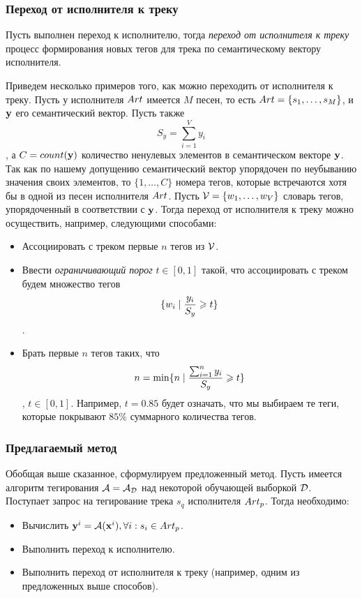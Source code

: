 \subsubsection{Переход от исполнителя к треку}

Пусть выполнен переход к исполнителю, тогда \emph{переход от исполнителя к треку} \ld процесс формирования новых тегов для трека по семантическому вектору исполнителя.

Приведем несколько примеров того, как можно переходить от исполнителя к треку. Пусть у исполнителя ${Art}$ имеется $M$ песен, то есть ${Art} = \{ s_1, \ldots, s_M \}$, 
и $\mathbf{y}$ \ld его семантический вектор. Пусть также $$S_y = \sum_{i=1}^{V} y_i$$, а $C = count(\mathbf{y})$ \ld количество ненулевых элементов в семантическом векторе $\mathbf{y}$.
Так как по нашему допущению семантический вектор упорядочен по неубыванию значения своих элементов, то $\{ 1, \ldots, C \}$ \ld номера тегов, которые встречаются хотя бы в одной 
из песен исполнителя ${Art}$. Пусть $\mathcal{V} = \{w_1, \ldots, w_V \}$ \ld словарь тегов, упорядоченный в соответствии с $\mathbf{y}$. 
Тогда переход от исполнителя к треку можно осуществить, например, следующими способами:
\begin{itemize}
 \item Ассоциировать с треком первые $n$ тегов из $\mathcal{V}$.
 \item Ввести \emph{ограничивающий порог} $t \in [0, 1]$ такой, что ассоциировать с треком будем множество тегов 
 $$ \{ w_i \mid \frac{y_i}{S_y} \geqslant t \} $$.
 \item Брать первые $n$ тегов таких, что $$n = \min \{ n \mid \frac{\sum_{i=1}^{n} y_i}{S_y} \geqslant t \}$$, $t \in [0, 1]$. Например, $t = 0.85$ будет означать, 
 что мы выбираем те теги, которые покрывают $85\%$ суммарного количества тегов.
\end{itemize}

\subsubsection{Предлагаемый метод}

Обобщая выше сказанное, сформулируем предложенный метод. Пусть имеется алгоритм тегирования $\mathcal{A} = \mathcal{A}_{\mathcal{D}}$ над некоторой обучающей выборкой $\mathcal{D}$.
Поступает запрос на тегирование трека $s_q$ исполнителя ${Art}_p$. Тогда необходимо:
\begin{itemize}
 \item Вычислить $\mathbf{y}^i = \mathcal{A}(\mathbf{x}^i), \forall i: s_i \in {Art}_p$.
 \item Выполнить переход к исполнителю.
 \item Выполнить переход от исполнителя к треку (например, одним из предложенных выше способов).
\end{itemize}

